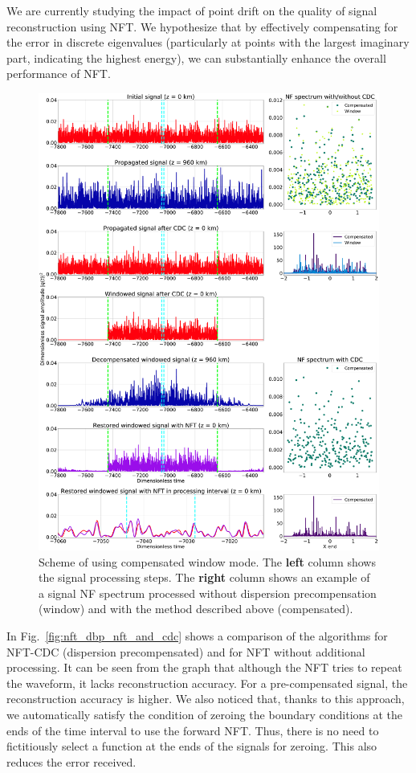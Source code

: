 We are currently studying the impact of point drift on the quality of signal reconstruction using NFT. We hypothesize that by effectively compensating for the error in discrete eigenvalues (particularly at points with the largest imaginary part, indicating the highest energy), we can substantially enhance the overall performance of NFT.


\begin{figure}[htbp]
    \centering
        \includegraphics[width=0.95\linewidth]{images/window/nft_windowed_cdc_scheme.pdf}
    \caption{Scheme of using compensated window mode. The \textbf{left} column shows the signal processing steps. The \textbf{right} column shows an example of a signal NF spectrum processed without dispersion precompensation (window) and with the method described above (compensated).}
    \label{fig:nft_windowed_scheme}
\end{figure}


In Fig.~\ref{fig:nft_dbp_nft_and_cdc} shows a comparison of the algorithms for NFT-CDC (dispersion precompensated) and for NFT without additional processing.
It can be seen from the graph that although the NFT tries to repeat the waveform, it lacks reconstruction accuracy. For a pre-compensated signal, the reconstruction accuracy is higher. We also noticed that, thanks to this approach, we automatically satisfy the condition of zeroing the boundary conditions at the ends of the time interval to use the forward NFT. Thus, there is no need to fictitiously select a function at the ends of the signals for zeroing. This also reduces the error received.


